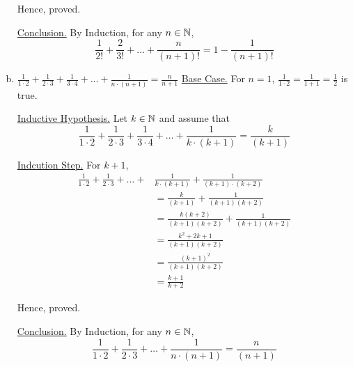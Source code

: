 \begin{enumerate}[(a).]
		Hence, proved.
		
		\underline{Conclusion.} By Induction, for any $n \in \mathbb{N}$,
		$$\frac{1}{2!} + \frac{2}{3!} + \ldots + \frac{n}{(n+1)!} = 1 - \frac{1}{(n+1)!}$$
		\es

	\item $\displaystyle \frac{1}{1 \cdot 2} + \frac{1}{2 \cdot 3} + \frac{1}{3 \cdot 4} + \ldots + \frac{1}{n \cdot (n+1)} = \frac{n}{n+1}$
		\bs 
		\underline{Base Case.} For $n = 1$, $\frac{1}{1 \cdot 2} = \frac{1}{1+1} = \frac{1}{2}$ is true.

		\underline{Inductive Hypothesis.} Let $k \in \mathbb{N}$ and assume that 
		$$\frac{1}{1 \cdot 2} + \frac{1}{2 \cdot 3} + \frac{1}{3 \cdot 4} + \ldots + \frac{1}{k \cdot (k+1)} = \frac{k}{(k+1)}$$
		
		\underline{Indcution Step.} For $k+1$,
		\begin{align*}
			\frac{1}{1 \cdot 2} + \frac{1}{2 \cdot 3} + \ldots + &\frac{1}{k \cdot (k+1)} + \frac{1}{(k+1) \cdot (k+2)} \\
				&= \frac{k}{(k+1)} + \frac{1}{(k+1)(k+2)} \\
				&= \frac{k(k+2)}{(k+1)(k+2)} + \frac{1}{(k+1)(k+2)} \\
				&= \frac{k^2 + 2k + 1}{(k+1)(k+2)} \\
				&= \frac{(k+1)^2}{(k+1)(k+2)} \\
				&= \frac{k+1}{k+2}
		\end{align*}

		Hence, proved.
		
		\underline{Conclusion.} By Induction, for any $n \in \mathbb{N}$,
		$$\frac{1}{1 \cdot 2} + \frac{1}{2 \cdot 3} + \ldots + \frac{1}{n \cdot (n+1)} = \frac{n}{(n+1)}$$
		\es
\end{enumerate}
\ep

